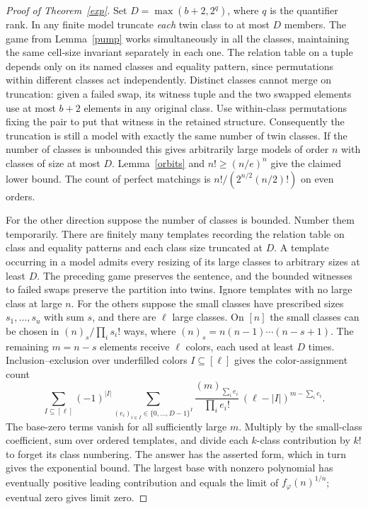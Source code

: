 \documentclass[11pt]{article}
\begin{document}
\begin{proof}[Proof of Theorem~\ref{exp}]
Set $D=\max(b+2,2^q)$, where $q$ is the quantifier rank. In any finite model truncate \emph{each} twin class to at most $D$ members. The game from Lemma~\ref{pump} works simultaneously in all the classes, maintaining the same cell-size invariant separately in each one. The relation table on a tuple depends only on its named classes and equality pattern, since permutations within different classes act independently. Distinct classes cannot merge on truncation: given a failed swap, its witness tuple and the two swapped elements use at most $b+2$ elements in any original class. Use within-class permutations fixing the pair to put that witness in the retained structure. Consequently the truncation is still a model with exactly the same number of twin classes. If the number of classes is unbounded this gives arbitrarily large models of order $n$ with classes of size at most $D$. Lemma~\ref{orbits} and $n!\ge(n/e)^n$ give the claimed lower bound. The count of perfect matchings is $n!/(2^{n/2}(n/2)!)$ on even orders.

For the other direction suppose the number of classes is bounded. Number them temporarily. There are finitely many templates recording the relation table on class and equality patterns and each class size truncated at $D$. A template occurring in a model admits every resizing of its large classes to arbitrary sizes at least $D$. The preceding game preserves the sentence, and the bounded witnesses to failed swaps preserve the partition into twins. Ignore templates with no large class at large $n$. For the others suppose the small classes have prescribed sizes $s_1,\ldots,s_u$ with sum $s$, and there are $\ell$ large classes. On $[n]$ the small classes can be chosen in $(n)_s/\prod_i s_i!$ ways, where $(n)_s=n(n-1)\cdots(n-s+1)$. The remaining $m=n-s$ elements receive $\ell$ colors, each used at least $D$ times. Inclusion--exclusion over underfilled colors $I\subseteq[\ell]$ gives the color-assignment count
\[
 \sum_{I\subseteq[\ell]}(-1)^{|I|}
 \sum_{(e_i)_{i\in I}\in\{0,\ldots,D-1\}^I}
       \frac{(m)_{\sum_i e_i}}{\prod_i e_i!}\,(\ell-|I|)^{m-\sum_i e_i}.
\]
The base-zero terms vanish for all sufficiently large $m$. Multiply by the small-class coefficient, sum over ordered templates, and divide each $k$-class contribution by $k!$ to forget its class numbering. The answer has the asserted form, which in turn gives the exponential bound. The largest base with nonzero polynomial has eventually positive leading contribution and equals the limit of $f_\varphi(n)^{1/n}$; eventual zero gives limit zero.
\end{proof}
\end{document}
